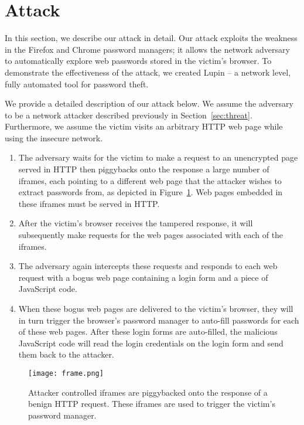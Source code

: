 \documentclass[letterpaper,twocolumn,10pt]{article}
\begin{document}
\section{Attack}
\label{sec:attack}
In this section, we describe our attack in detail. Our attack exploits 
the weakness in the Firefox and Chrome password managers; it allows 
the network adversary to automatically explore web passwords stored in 
the victim's browser. To demonstrate the effectiveness of the attack, 
we created Lupin -- a network level, fully automated tool for password 
theft. 

We provide a detailed description of our attack below. We assume the 
adversary to be a network attacker described previously in 
Section~\ref{sec:threat}. Furthermore, we assume the victim visits an 
arbitrary HTTP web page while using the insecure network. 
\begin{enumerate}
	\item The adversary waits for the victim to make a request to 
an unencrypted page served in HTTP then piggybacks onto the response 
a large number of iframes, each pointing to a different web page that 
the attacker wishes to extract passwords from, as depicted in 
Figure~\ref{fig:frame}. Web pages embedded in these iframes must be 
served in HTTP.
	\item After the victim's browser receives the tampered 
response, it will subsequently make requests for the web pages 
associated with each of the iframes. 
	\item The adversary again intercepts these requests and 
responds to each web request with a bogus web page containing a login 
form and a piece of JavaScript code. 
	\item When these bogus web pages are delivered to the victim's 
browser, they will in turn trigger the browser's password manager to 
auto-fill passwords for each of these web pages. After these login 
forms are auto-filled, the malicious JavaScript code will read the 
login credentials on the login form and send them back to the 
attacker.
\end{enumerate}    

\begin{figure}[ht]
\begin{center}
	
\texttt{[image: frame.png]}
\end{center}
\caption{Attacker controlled iframes are piggybacked onto the response 
of a benign HTTP request. These iframes are used to trigger the 
victim's password manager.}
\label{fig:frame}
\end{figure}
\end{document}
